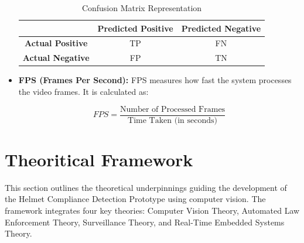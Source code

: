 \begin{refsection}
\begin{itemize}
    \begin{table}[ht]
    \centering
    \caption{Confusion Matrix Representation}
    \label{tbl:confusionMatrix}
    \begin{tabular}{|c|c|c|}
        \hline
        & \textbf{Predicted Positive} & \textbf{Predicted Negative} \\ \hline
        \textbf{Actual Positive} & TP & FN \\ \hline
        \textbf{Actual Negative} & FP & TN \\ \hline
    \end{tabular}
    \end{table}

    \item \textbf{FPS (Frames Per Second):} FPS measures how fast the system processes the video frames. It is calculated as:

    \begin{equation}
        FPS = \frac{\text{Number of Processed Frames}}{\text{Time Taken (in seconds)}}
        \label{eq:fps}
    \end{equation}
\end{itemize}


\section*{Theoritical Framework}

This section outlines the theoretical underpinnings guiding the development of the Helmet Compliance Detection Prototype using computer vision. The framework integrates four key theories: Computer Vision Theory, Automated Law Enforcement Theory, Surveillance Theory, and Real-Time Embedded Systems Theory.


\end{refsection}
